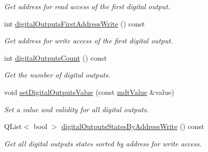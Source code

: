\begin{DoxyCompactItemize}
\begin{DoxyCompactList}\small\item\em Get address for read access of the first digital output. \end{DoxyCompactList}\item 
\hypertarget{classmdt_device_ios_af1e9a9ae2e49a031b74571c6386c785a}{
int \hyperlink{classmdt_device_ios_af1e9a9ae2e49a031b74571c6386c785a}{digitalOutputsFirstAddressWrite} () const }
\label{classmdt_device_ios_af1e9a9ae2e49a031b74571c6386c785a}

\begin{DoxyCompactList}\small\item\em Get address for write access of the first digital output. \end{DoxyCompactList}\item 
\hypertarget{classmdt_device_ios_a81041e03a387fdcdc2638527b27a0ff6}{
int \hyperlink{classmdt_device_ios_a81041e03a387fdcdc2638527b27a0ff6}{digitalOutputsCount} () const }
\label{classmdt_device_ios_a81041e03a387fdcdc2638527b27a0ff6}

\begin{DoxyCompactList}\small\item\em Get the number of digital outputs. \end{DoxyCompactList}\item 
\hypertarget{classmdt_device_ios_a5685ba4a6cee6fad1555dc9b51d1d932}{
void \hyperlink{classmdt_device_ios_a5685ba4a6cee6fad1555dc9b51d1d932}{setDigitalOutputsValue} (const \hyperlink{classmdt_value}{mdtValue} \&value)}
\label{classmdt_device_ios_a5685ba4a6cee6fad1555dc9b51d1d932}

\begin{DoxyCompactList}\small\item\em Set a value and validity for all digital outputs. \end{DoxyCompactList}\item 
\hypertarget{classmdt_device_ios_a67388ae8181a19da07f7b74320a516e3}{
QList$<$ bool $>$ \hyperlink{classmdt_device_ios_a67388ae8181a19da07f7b74320a516e3}{digitalOutputsStatesByAddressWrite} () const }
\label{classmdt_device_ios_a67388ae8181a19da07f7b74320a516e3}

\begin{DoxyCompactList}\small\item\em Get all digital outputs states sorted by address for write access. \end{DoxyCompactList}\end{DoxyCompactItemize}


